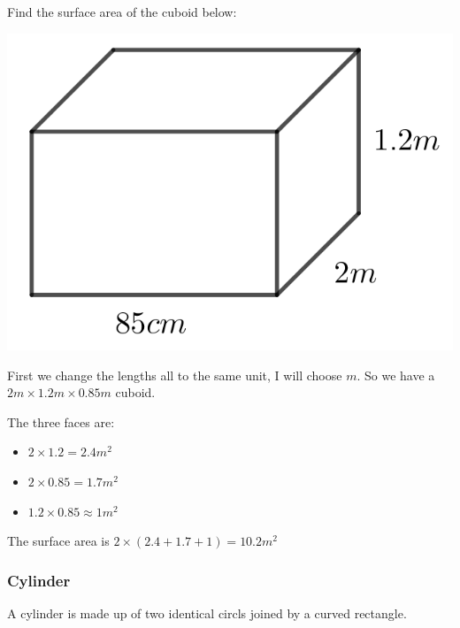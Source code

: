 \begin{exmp}
Find the surface area of the cuboid below:

\bigskip

\includegraphics{./Images/Measurement/CuboidEg.png}

\bigskip

First we change the lengths all to the same unit, I will choose $m$.  So we have a $2m \times 1.2m \times 0.85m$ cuboid.

The three faces are:

\begin{itemize}
	\item $2 \times 1.2 = 2.4m^2$
	\item $2 \times 0.85 = 1.7m^2$
	\item $1.2 \times 0.85 \approx 1m^2$
\end{itemize}

The surface area is $2 \times (2.4 + 1.7 + 1)=10.2m^2$
\end{exmp}

\subsubsection{Cylinder}
A cylinder is made up of two identical circls joined by a curved rectangle.

\bigskip

